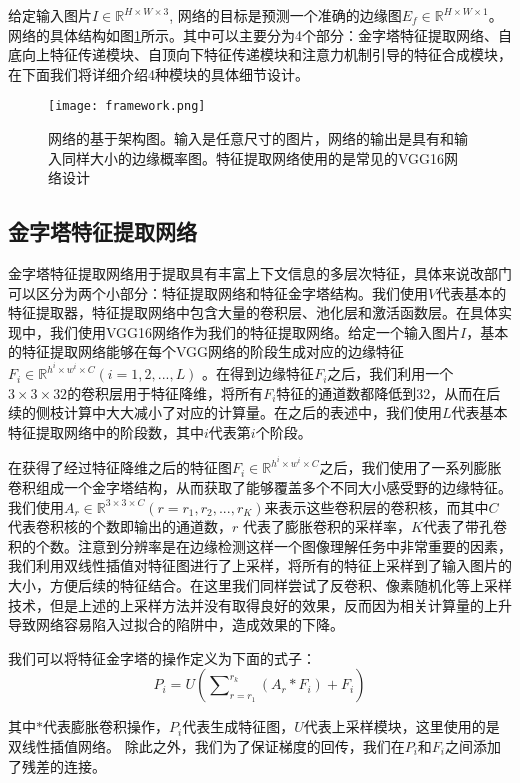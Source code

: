 \documentclass[master]{thesis-uestc}
\begin{document}
{给定输入图片$I \in \mathbb{R}^{H \times W \times 3}$, 网络的目标是预测一个准确的边缘图$E_f\in \mathbb{R}^{H \times W \times 1}$。网络的具体结构如图\ref{framework2}所示。其中可以主要分为4个部分：金字塔特征提取网络、自底向上特征传递模块、自顶向下特征传递模块和注意力机制引导的特征合成模块，在下面我们将详细介绍4种模块的具体细节设计。
\begin{figure}[h!]
    \texttt{[image: framework.png]}
    \caption{网络的基于架构图。输入是任意尺寸的图片，网络的输出是具有和输入同样大小的边缘概率图。特征提取网络使用的是常见的VGG16网络设计}
    \label{framework2}
\end{figure}

\subsection{金字塔特征提取网络}
金字塔特征提取网络用于提取具有丰富上下文信息的多层次特征，具体来说改部门可以区分为两个小部分：特征提取网络和特征金字塔结构。我们使用$V$代表基本的特征提取器，特征提取网络中包含大量的卷积层、池化层和激活函数层。在具体实现中，我们使用VGG16网络作为我们的特征提取网络。给定一个输入图片$I$，基本的特征提取网络能够在每个VGG网络的阶段生成对应的边缘特征$F_i\in \mathbb{R}^{h^i \times w^i \times C}(i=1,2,...,L)$ 。在得到边缘特征$F_i$之后，我们利用一个$3 \times 3 \times  32$的卷积层用于特征降维，将所有$F_i$特征的通道数都降低到32，从而在后续的侧枝计算中大大减小了对应的计算量。在之后的表述中，我们使用$L$代表基本特征提取网络中的阶段数，其中$i$代表第$i$个阶段。

在获得了经过特征降维之后的特征图$F_i\in \mathbb{R}^{h^i \times w^i \times C}$之后，我们使用了一系列膨胀卷积组成一个金字塔结构，从而获取了能够覆盖多个不同大小感受野的边缘特征。我们使用${A_r \in \mathbb{R}^{3 \times 3 \times C}}(r=r_1,r_2,...,r_K)$来表示这些卷积层的卷积核，而其中$C$代表卷积核的个数即输出的通道数，$r$
代表了膨胀卷积的采样率，$K$代表了带孔卷积的个数。注意到分辨率是在边缘检测这样一个图像理解任务中非常重要的因素，我们利用双线性插值对特征图进行了上采样，将所有的特征上采样到了输入图片的大小，方便后续的特征结合。在这里我们同样尝试了反卷积、像素随机化等上采样技术，但是上述的上采样方法并没有取得良好的效果，反而因为相关计算量的上升导致网络容易陷入过拟合的陷阱中，造成效果的下降。

我们可以将特征金字塔的操作定义为下面的式子：
\begin{equation}
    P_i = U(\sum\nolimits_{r=r_1}^{r_k}(A_r \ast F_i) + F_i)
\end{equation}

其中$\ast$代表膨胀卷积操作，$P_i$代表生成特征图，$U$代表上采样模块，这里使用的是双线性插值网络。 除此之外，我们为了保证梯度的回传，我们在$P_i$和$F_i$之间添加了残差的连接。

}
\end{document}
